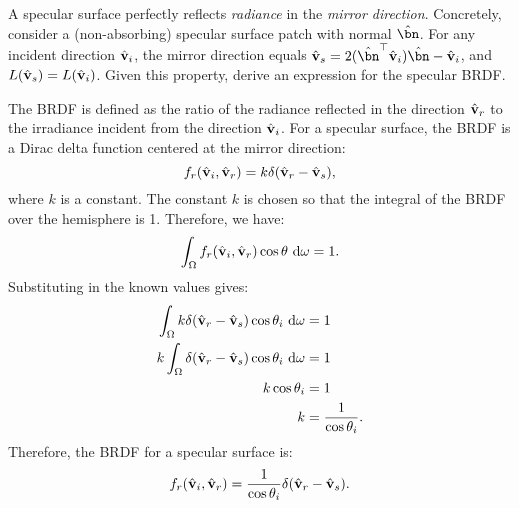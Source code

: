 \begin{problem}
\begin{enumroman}
    \newpage
    \item A specular surface perfectly reflects \emph{radiance} in the
      \emph{mirror direction}. Concretely, consider a (non-absorbing)
      specular surface patch with normal $\hat{\bn}$.
      For any incident direction $\hat{\mathbf{v}}_i$, the mirror direction
      equals $\hat{\bv}_s = 2(\hat{\bn}^\top \hat{\bv}_i)\hat{\bn} - \hat{\bv}_i$,
      and $L(\hat{\mathbf{v}}_s) = L(\hat{\mathbf{v}}_i)$.
      Given this property, derive an expression for the specular BRDF.
      \begin{answer}
        The BRDF is defined as the ratio of the radiance reflected in the
        direction $\hat{\mathbf{v}}_r$ to the irradiance incident from the direction
        $\hat{\mathbf{v}}_i$. For a specular surface, the BRDF is a Dirac delta function
        centered at the mirror direction:
        \[
          f_r(\hat{\mathbf{v}}_i, \hat{\mathbf{v}}_r) = k \delta(\hat{\mathbf{v}}_r - \hat{\mathbf{v}}_s),
        \]
        where $k$ is a constant. The constant $k$ is chosen so that the integral
        of the BRDF over the hemisphere is 1. Therefore, we have:
        \[
          \int_{\Omega} f_r(\hat{\mathbf{v}}_i, \hat{\mathbf{v}}_r) \cos\theta \text{ d}\omega = 1.
        \]
        Substituting in the known values gives:
        \begin{align*}
          \int_{\Omega} k \delta(\hat{\mathbf{v}}_r - \hat{\mathbf{v}}_s) \cos\theta_i \text{ d}\omega &= 1 \\
          k \int_{\Omega} \delta(\hat{\mathbf{v}}_r - \hat{\mathbf{v}}_s) \cos\theta_i \text{ d}\omega &= 1 \\
          k \cos\theta_i &= 1 \\
          k &= \frac{1}{\cos\theta_i}.
        \end{align*}
        Therefore, the BRDF for a specular surface is:
        \[
          f_r(\hat{\mathbf{v}}_i, \hat{\mathbf{v}}_r) = \frac{1}{\cos\theta_i} \delta(\hat{\mathbf{v}}_r - \hat{\mathbf{v}}_s).
        \]
      \end{answer}
  \end{enumroman}
\end{problem}
